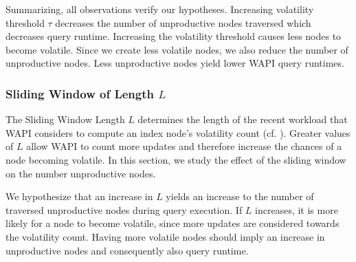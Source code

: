 \documentclass[abstracton,12pt]{scrartcl}
\theoremstyle{definition}
\begin{document}
Summarizing, all observations verify our hypotheses.
Increasing volatility threshold $\tau$ decreases the number of unproductive
nodes traversed which decreases query runtime. Increasing the volatility
threshold causes less nodes to become volatile. Since we create less volatile
nodes, we also reduce the number of unproductive nodes. Less unproductive
nodes yield lower WAPI query runtimes. 

\subsubsection{Sliding Window of Length $L$}

\label{sec:sliding-window}

The Sliding Window Length $L$ determines the length of the recent workload that WAPI
considers to compute an index node's volatility count (cf. ).
Greater values of $L$
allow WAPI to count more updates and therefore increase the chances of a node
becoming volatile. In this section, we study
the effect of the sliding window on the number unproductive nodes.

We hypothesize that an increase in $L$ yields an increase to the number of
traversed unproductive nodes during query execution. If $L$ increases, it is
more likely for a node to become volatile, since more updates are considered
towards the volatility count.
Having more volatile nodes should imply an increase in unproductive nodes and
consequently also query runtime.


\end{document}
